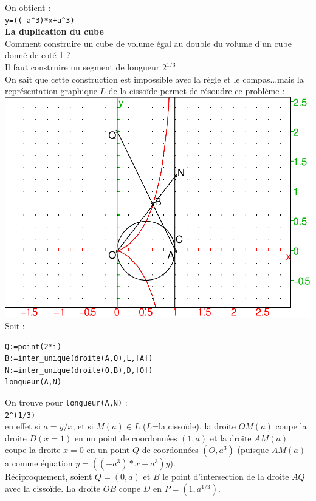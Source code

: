 \documentclass[a4paper,11pt]{book}
\begin{document}
On obtient :\\
{\tt y=((-a\verb|^|3)*x+a\verb|^|3)}\\
{\bf La duplication du cube}\\
Comment construire un cube de volume \'egal au double du volume d'un cube 
donn\'e de cot\'e 1 ?\\
Il faut construire un segment de longueur $2^{1/3}$.\\
On sait que cette construction est impossible avec la r\`egle et le 
compas...mais la repr\'esentation graphique $L$ de la cisso\"{i}de permet de 
r\'esoudre ce probl\`eme :\\
\includegraphics[width=\textwidth]{cissoide1}\\
Soit :
\begin{verbatim}
Q:=point(2*i)
B:=inter_unique(droite(A,Q),L,[A])
N:=inter_unique(droite(O,B),D,[O])
longueur(A,N)
\end{verbatim}
On trouve pour {\tt longueur(A,N)} :\\
{\tt 2\verb|^|(1/3)}\\
en effet si $a=y/x$, et si $M(a)\in L$ ($L$=la cisso\"{i}de), la droite $OM(a)$ 
coupe la droite 
$D(x=1)$ en un point de coordonn\'ees $(1,a)$ et la droite $AM(a)$ coupe la 
droite $x=0$ en un point $Q$ de coordonn\'ees $(O,a^3)$ (puisque $AM(a)$ a 
comme \'equation $y=((-a^3)*x+a^3)y$).\\
R\'eciproquement, soient $Q=(0,a)$ et $B$ le point d'intersection de la droite 
$AQ$ avec la cisso\"{i}de. La droite $OB$ coupe $D$ en $P=(1,a^{1/3})$.
\end{document}
